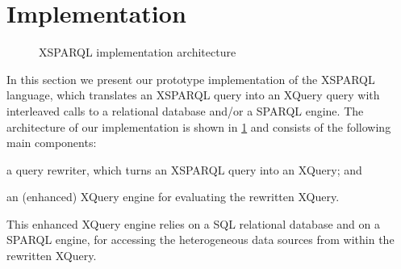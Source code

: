 \section{Implementation}
\label{sec:implementation}

\begin{figure}[t]
  \centering
  
  \caption{XSPARQL implementation architecture}
  \label{fig:arch}
\end{figure}
%
In this section we present our prototype implementation of the XSPARQL language, which translates an XSPARQL query into
an XQuery query with interleaved calls to a relational database and/or a SPARQL engine.  The architecture of our
implementation is shown in \cref{fig:arch} and consists of the following main components:
%
\begin{inparaenum}[(1)]
\item\label{item:arch-1} a query rewriter, which turns an XSPARQL query into an XQuery; and
\item\label{item:arch-2} an (enhanced) XQuery engine for evaluating the rewritten XQuery.
\end{inparaenum}
%
This enhanced XQuery engine relies on a \ac{SQL} relational database and on a SPARQL engine, for accessing the
heterogeneous data sources from within the rewritten XQuery.

